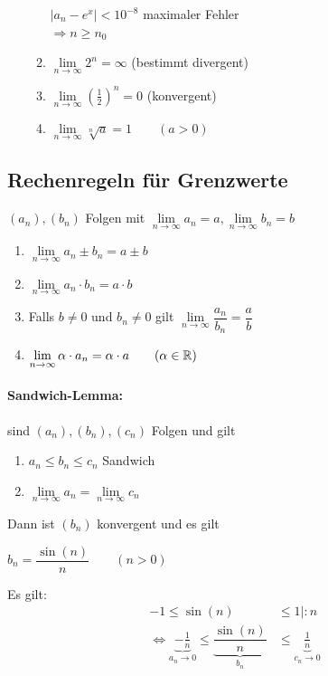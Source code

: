 \begin{enumerate}
\begin{enumerate}
		$|a_n-e^x|<10^{-8}$ maximaler Fehler\\
		$\Rightarrow n\ge n_0$
		
		\item $\lim\limits_{n\to\infty}2^n=\infty$ (bestimmt divergent)
		\item $\lim\limits_{n\to\infty}(\frac{1}{2})^n=0$ (konvergent)
		\item $\lim\limits_{n\to\infty}\sqrt[n]{a}=1 \qquad (a>0)$
	\end{enumerate}
\end{enumerate}

\subsection{Rechenregeln für Grenzwerte}
$(a_n),(b_n)$ Folgen mit $\lim\limits_{n\to\infty} a_n = a,\lim\limits_{n\to\infty} b_n = b$
\begin{enumerate}
	\item $\lim\limits_{n\to\infty} a_n\pm b_n = a\pm b$
	\item $\lim\limits_{n\to\infty} a_n\cdot b_n = a\cdot b$
	\item Falls $b\ne0$ und $b_n\ne0$ gilt $\lim\limits_{n\to\infty} \dfrac{a_n}{b_n} = \dfrac{a}{b}$
	\item $\lim\limits_{n\to\infty} \alpha\cdot a_n = \alpha\cdot a \qquad (\alpha\in\mathbb{R})$
\end{enumerate}

\paragraph{Sandwich-Lemma:} sind $(a_n),(b_n),(c_n)$ Folgen und gilt
\begin{enumerate}
	\item $a_n\le b_n\le c_n$ {\flqq Sandwich\frqq}
	\item $\lim\limits_{n\to\infty} a_n =\lim\limits_{n\to\infty} c_n$
\end{enumerate}
Dann ist $(b_n)$ konvergent und es gilt 

\Bsp $b_n = \dfrac{\sin(n)}{n}\qquad (n>0)$

Es gilt:
\begin{align*}
-1\le\sin(n) &\le1\mid\colon n\\
\Leftrightarrow \underbrace{-\frac{1}{n}}_{a_n\to0}\le\underbrace{\dfrac{\sin(n)}{n}}_{b_n} &\le\underbrace{\frac{1}{n}}_{c_n\to0}\\
\end{align*}

